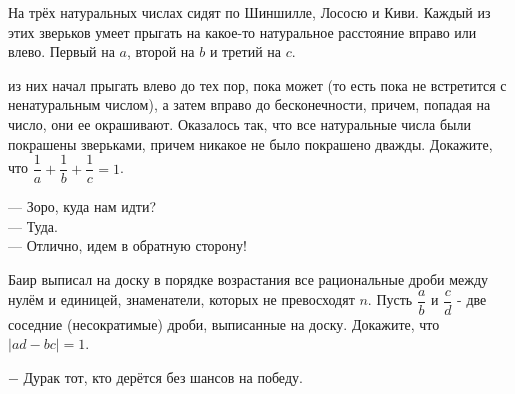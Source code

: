 На трёх натуральных числах сидят по Шиншилле, Лососю и Киви. Каждый из этих зверьков умеет прыгать на какое-то натуральное расстояние вправо или влево. Первый на $a$, второй на $b$ и третий на $c$.

\newpage

\hspace{3mm}

 из них начал прыгать влево до тех пор, пока может (то есть пока не встретится с ненатуральным числом), а затем вправо до бесконечности, причем, попадая на число, они ее окрашивают. Оказалось так, что все натуральные числа были покрашены зверьками, причем никакое не было покрашено дважды. Докажите, что $ \dfrac{1}{a} + \dfrac{1}{b} + \dfrac{1}{c} = 1$.

\begin{flushright}
    \scriptsize{— Зоро, куда нам идти?\\
                — Туда.\\
                — Отлично, идем в обратную сторону!}
\end{flushright}

\hspace{3mm}

 Баир выписал на доску в порядке возрастания все рациональные дроби между нулём и единицей, знаменатели, которых не превосходят $n$. Пусть $\dfrac{a}{b}$ и $\dfrac{c}{d}$ - две соседние (несократимые) дроби, выписанные на доску. Докажите, что $|ad - bc| = 1$.

\begin{flushright}
    \scriptsize{$-$ Дурак тот, кто дерётся без шансов на победу.}
\end{flushright}


